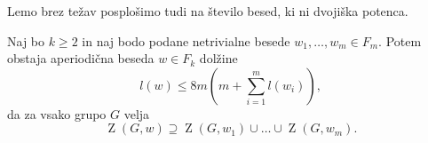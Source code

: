 Lemo brez težav posplošimo tudi na število besed, ki ni dvojiška potenca.
\begin{lema}
\label{lem_komutatorska_lema_splosna}
Naj bo $k \ge 2$ in naj bodo podane netrivialne besede $w_1, \ldots, w_{m} \in  F_m$. Potem obstaja aperiodična beseda $w \in F_k$ dolžine \begin{equation*}
l(w) \le 8m \left(m +  \sum_{i = 1}^{m} l(w_{i}) \right),
\end{equation*}  
da za vsako grupo $G$ velja \begin{equation*}
\operatorname{Z}(G, w) \supseteq \operatorname{Z}(G, w_1) \cup \ldots \cup  \operatorname{Z}(G, w_{m}).
\end{equation*}    
\end{lema}


